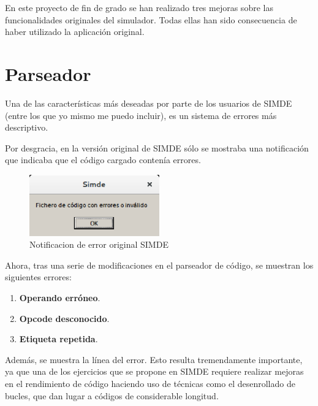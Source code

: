 

En este proyecto de fin de grado se han realizado tres mejoras sobre las 
funcionalidades originales del simulador. Todas ellas han sido consecuencia
de haber utilizado la aplicación original.


\section{Parseador}
\label{6:sec1}

Una de las características más deseadas por parte de los usuarios de SIMDE 
(entre los que yo mismo me puedo incluir), es un sistema de errores más descriptivo. 

\bigskip
Por desgracia, en la versión original de SIMDE sólo se mostraba una notificación que indicaba
que el código cargado contenía errores.

\begin{figure}[!th]
\begin{center}
\includegraphics[width=0.5\textwidth]{images/cap6/errorsimde.eps}
\caption{Notificacion de error original SIMDE}
\end{center}
\end{figure}

Ahora, tras una serie de modificaciones en el parseador de código, se muestran los siguientes errores:

\begin{enumerate}
\item \textbf{Operando erróneo}.
\item \textbf{Opcode desconocido}.
\item \textbf{Etiqueta repetida}.
\end{enumerate}

Además, se muestra la línea del error. Esto resulta tremendamente importante, 
ya que una de los ejercicios que se propone en SIMDE requiere realizar mejoras en el rendimiento
de código haciendo uso de técnicas como el desenrollado de bucles, que dan lugar a códigos de considerable
longitud.

